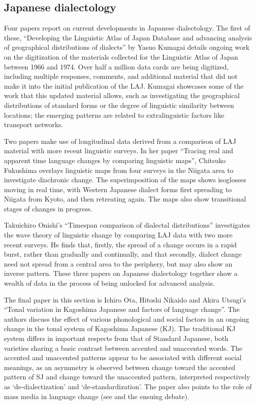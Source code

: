 \documentclass[output=paper]{LSP/langsci}
\begin{document}
\subsection{Japanese dialectology}

Four  papers report on current developments in Japanese dialectology. The first of these, “Developing the Linguistic Atlas of Japan Database and advancing analysis of geographical distributions of dialects” by Yasuo Kumagai details ongoing work on the digitization of the materials collected for the Linguistic Atlas of Japan between 1966 and 1974. Over half a million data cards are being digitized, including multiple responses, comments, and additional material that did not make it into the initial publication of the LAJ. Kumagai showcases some of the work that this updated material allows, such as investigating the geographical distributions of standard forms or the degree of linguistic similarity between locations; the emerging patterns are related to extralinguistic factors like transport networks.

Two papers make use of longitudinal data derived from a comparison of LAJ material with more recent linguistic surveys. In her paper “Tracing real and apparent time language changes by comparing linguistic maps”, Chitsuko Fukushima overlays linguistic maps from four surveys in the Niigata area to investigate diachronic change. The superimposition of the maps shows isoglosses moving in real time, with Western Japanese dialect forms first spreading to Niigata from Kyoto, and then retreating again. The maps also show transitional stages of changes in progress.

Takuichiro Onishi’s “Timespan comparison of dialectal distributions” investigates the wave theory of linguistic change by comparing LAJ data with two more recent surveys. He finds that, firstly, the spread of a change occurs in a rapid burst, rather than gradually and continually, and that secondly, dialect change need not spread from a central area to the periphery, but may also show an inverse pattern. These three papers on Japanese dialectology together show a wealth of data in the process of being unlocked for advanced analysis.

The final paper in this section is Ichiro Ota, Hitoshi Nikaido and Akira Utsugi’s “Tonal variation in Kagoshima Japanese and factors of language change”. The authors discuss the effect of various phonological and social factors in an ongoing change in the tonal system of Kagoshima Japanese (KJ). The traditional KJ system differs in important respects from that of Standard Japanese, both varieties sharing a basic contrast between accented and unaccented words. The accented and unaccented patterns appear to be associated with different social meanings, as an asymmetry is observed between change toward the accented pattern of SJ and change toward the unaccented pattern, interpreted respectively as ‘de-dialectization’ and ‘de-standardization’. The paper also points to the role of mass media in language change (see \citealt{sayers_mediated_2014} and the ensuing debate).  
\end{document}
